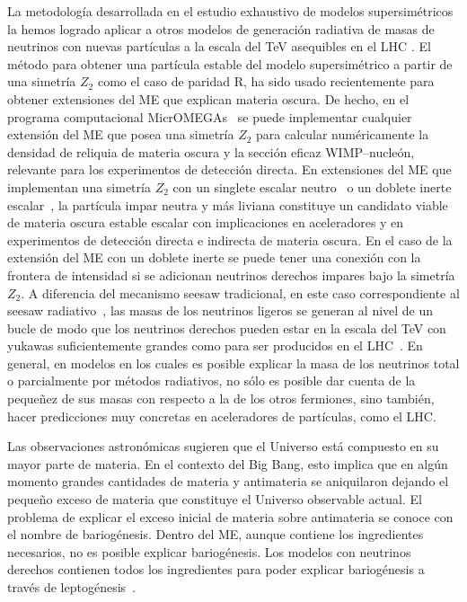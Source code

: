 La metodología desarrollada en el estudio exhaustivo de modelos
supersimétricos la hemos logrado aplicar a otros modelos de generación
radiativa de masas de neutrinos con nuevas partículas a la escala del
TeV asequibles en el LHC
\cite{Sierra:2008wj,AristizabalSierra:2006ri}.
El método para obtener una partícula estable del modelo supersimétrico
a partir de una simetría $Z_2$ como el caso de paridad R, ha sido
usado recientemente para obtener extensiones del ME que
explican materia oscura. De hecho, en el programa computacional
MicrOMEGAs~\cite{Belanger:2006is} se puede implementar cualquier
extensión del ME que posea una simetría $Z_2$ para
calcular numéricamente la densidad de reliquia de materia oscura y la
sección eficaz WIMP--nucleón, relevante para los experimentos de
detección directa. En extensiones del ME que implementan
una simetría $Z_2$ con un singlete escalar
neutro~\cite{McDonald:1993ex,Burgess:2000yq,Davoudiasl:2004be,Barger:2007im,Dick:2008ah,Yaguna:2008hd,Goudelis:2009zz,Yaguna:2011qn} o un doblete
inerte escalar~\cite{Barbieri:2006dq,Majumdar:2006nt,Hambye:2007vf,LopezHonorez:2006gr,Gustafsson:2007pc,Agrawal:2008xz,Andreas:2009hj,Nezri:2009jd,Lundstrom:2008ai,Dolle:2009ft}, la partícula impar neutra y más liviana
constituye un candidato viable de materia oscura estable escalar con
implicaciones en aceleradores y en experimentos de detección
directa e indirecta de materia
oscura. En el caso de la extensión del ME con un doblete
inerte se puede tener una conexión con la frontera de intensidad si se
adicionan neutrinos derechos impares bajo la simetría $Z_2$. A
diferencia del mecanismo seesaw tradicional, en este caso
correspondiente al seesaw radiativo~\cite{Ma:2006km,Kubo:2006yx,Kubo:2006rm,Suematsu:2009ww,Gelmini:2009xd}, las masas de los
neutrinos ligeros se generan al nivel de un bucle de modo que los
neutrinos derechos pueden estar en la escala del TeV con yukawas
suficientemente grandes como para ser producidos en el
LHC~\cite{Sierra:2008wj}. En general, en modelos en los cuales es
posible explicar la masa de los neutrinos total o parcialmente por
métodos radiativos, no sólo es posible dar cuenta de la pequeñez de
sus masas con respecto a la de los otros fermiones, sino también,
hacer predicciones muy concretas en aceleradores de partículas, como
el LHC.


Las observaciones astronómicas sugieren que el Universo está compuesto
en su mayor parte de materia. En el contexto del Big Bang, esto
implica que en algún momento grandes cantidades de materia y
antimateria se aniquilaron dejando el pequeño exceso de materia que
constituye el Universo observable actual. El problema de explicar el
exceso inicial de materia sobre antimateria se conoce con el nombre de
bariogénesis. Dentro del ME, aunque contiene los
ingredientes necesarios, no es posible explicar bariogénesis. Los
modelos con neutrinos derechos contienen todos los ingredientes para
poder explicar bariogénesis a través de leptogénesis~\cite{}.





